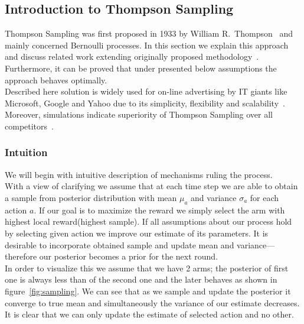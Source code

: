 \documentclass[12pt, a4paper, pdflatex, leqno]{report}
\begin{document}
\subsection{Introduction to Thompson Sampling\label{sec:thompson}}
Thompson Sampling was first proposed in 1933 by William R.\ Thompson~\citep{thompson:biom33} and mainly concerned Bernoulli processes. In this section we explain this approach and discuss related work extending originally proposed methodology~\citep{May:2012:OBS:2503308.2343711}. Furthermore, it can be proved that under presented below assumptions the approach behaves optimally.\\
Described here solution is widely used for on-line advertising by IT giants like Microsoft, Google and Yahoo due to its simplicity, flexibility and scalability~\citep{graepel2010web}. Moreover, simulations indicate superiority of Thompson Sampling over all competitors~\citep{May:simulation}.\\




\subsubsection{Intuition}
We will begin with intuitive description of mechanisms ruling the process.\\
With a view of clarifying we assume that at each time step we are able to obtain a sample from posterior distribution with mean $\mu_a$ and variance $\sigma_a$ for each action $a$. If our goal is to maximize the reward we simply select the arm with highest local reward(highest sample). If all assumptions about our process hold by selecting given action we improve our estimate of its parameters. It is desirable to incorporate obtained sample and update mean and variance---therefore our posterior becomes a prior for the next round.\\

In order to visualize this we assume that we have 2 arms; the posterior of first one is always less than of the second one and the later behaves as shown in figure~\ref{fig:sampling}. We can see that as we sample and update the posterior it converge to true mean and simultaneously the variance of our estimate decreases. It is clear that we can only update the estimate of selected action and no other.\\
\end{document}
